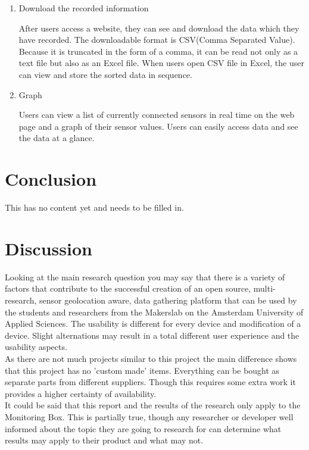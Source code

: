 \documentclass[conference]{IEEEtran}
\begin{document}
\begin{enumerate}
\begin{enumerate}
\begin{enumerate}
\item Download the recorded information

 After users access a website, they can see and download the data which they have recorded. The downloadable format is CSV(Comma Separated Value). Because it is truncated in the form of a comma, it can be read not only as a text file but also as an Excel file. When users open CSV file in Excel, the user can view and store the sorted data in sequence.\\

\item Graph

 Users can view a list of currently connected sensors in real time on the web page and a graph of their sensor values. Users can easily access data and see the data at a glance.\\

\end{enumerate}
\end{enumerate}
 
\end{enumerate}

\section{Conclusion}
This has no content yet and needs to be filled in. 

\section{Discussion}
Looking at the main research question you may say that there is a variety of factors that contribute to the successful creation of an open source, multi-research, sensor geolocation aware, data gathering platform that can be used by the students and researchers from the Makerslab on the Amsterdam University of Applied Sciences. The usability is different for every device and modification of a device. Slight alternations may result in a total different user experience and the usability aspects. \\
As there are not much projects similar to this project the main difference shows that this project has no 'custom made' items. Everything can be bought as separate parts from different suppliers. Though this requires some extra work it provides a higher certainty of availability. \\
It could be said that this report and the results of the research only apply to the Monitoring Box. This is partially true, though any researcher or developer well informed about the topic they are going to research for can determine what results may apply to their product and what may not.
\end{document}
